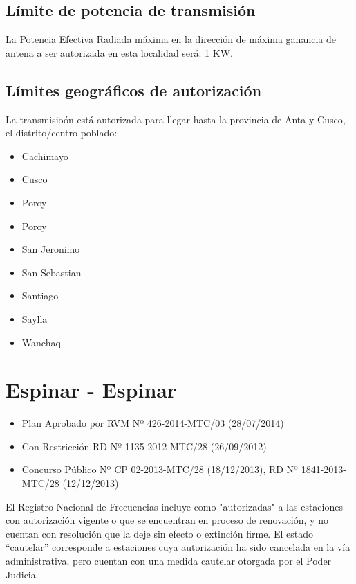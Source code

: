 \documentclass[a4paper]{IEEEtran} %
\begin{document}
\subsection{Límite de potencia de transmisión}

La Potencia Efectiva Radiada máxima en la dirección de máxima ganancia de antena a ser autorizada en esta localidad será: 1 KW.

\subsection{Límites geográficos de autorización}

La transmisioón está autorizada para llegar hasta la provincia de Anta y Cusco, el distrito/centro poblado:

\begin{itemize}
	\item Cachimayo
	\item Cusco
	\item Poroy
	\item Poroy
	\item San Jeronimo
	\item San Sebastian
	\item Santiago
	\item Saylla
	\item Wanchaq
\end{itemize}



\section{Espinar - Espinar}

\begin{itemize}
	\item Plan Aprobado por RVM Nº 426-2014-MTC/03 (28/07/2014)
	\item Con Restricción RD Nº 1135-2012-MTC/28 (26/09/2012)
	\item Concurso Público Nº CP 02-2013-MTC/28 (18/12/2013), RD Nº 1841-2013-MTC/28 (12/12/2013)
\end{itemize}

El Registro Nacional de Frecuencias incluye como "autorizadas" a las estaciones con autorización vigente o que se encuentran en proceso de renovación, y no cuentan con resolución que la deje sin efecto o extinción firme. El estado “cautelar” corresponde a estaciones cuya autorización ha sido cancelada en la vía administrativa, pero cuentan con una medida cautelar otorgada por el Poder Judicia.
\end{document}
